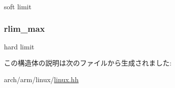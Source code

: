 soft limit \hypertarget{structArmLinux32_1_1rlimit_a09436dd8b2174416e96d0f45243dd6cf}{
\subsubsection[{rlim\_\-max}]{ {\bf rlim\_\-max}}}
\label{structArmLinux32_1_1rlimit_a09436dd8b2174416e96d0f45243dd6cf}


hard limit 

この構造体の説明は次のファイルから生成されました:\begin{DoxyCompactItemize}
\item 
arch/arm/linux/\hyperlink{arch_2arm_2linux_2linux_8hh}{linux.hh}\end{DoxyCompactItemize}
